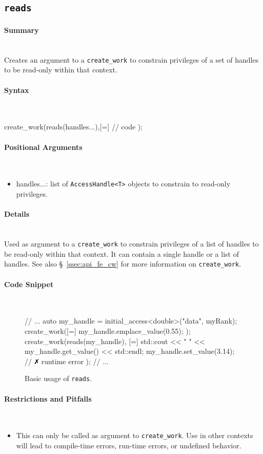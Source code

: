 \subsection{\texttt{reads}}
\label{ssec:api_fe_reads}

\paragraph{Summary} \mbox{}\\
Creates an argument to a \texttt{create\_work} to constrain
privileges of a set of handles to be read-only within that context.

\paragraph{Syntax} \mbox{}\\
\begin{CppCode}
create_work(reads(handles...),[=]{
	// code 
});
\end{CppCode}

\paragraph{Positional Arguments} \mbox{}\\
\begin{itemize}
  \item handles...: list of \texttt{AccessHandle<T>} objects to
  constrain to read-only privileges.
\end{itemize}


\paragraph{Details} \mbox{}\\
Used as argument to a \texttt{create\_work} to constrain
privileges of a list of handles to be read-only within that context.
It can contain a single handle or a list of handles.  See also
\S~\ref{ssec:api_fe_cw} for more information on \texttt{create\_work}.


\paragraph{Code Snippet} \mbox{}\\
\begin{figure}[!h]
\begin{CppCodeNumb}
// ...
auto my_handle = initial_access<double>("data", myRank);
create_work([=]{
  my_handle.emplace_value(0.55);
});
create_work(reads(my_handle), [=]{
  std::cout << " " << my_handle.get_value() << std::endl;
  my_handle.set_value(3.14); // $\no$ runtime error
});
// ... 
\end{CppCodeNumb}
\label{fig:fe_api_reads}
\caption{Basic usage of \texttt{reads}.}
\end{figure}


\paragraph{Restrictions and Pitfalls}\mbox{}\\
\begin{itemize}
  \item This can only be called as argument to \texttt{create\_work}.  Use in
  other contexts will lead to compile-time errors, run-time errors, or
  undefined behavior.
\end{itemize}
